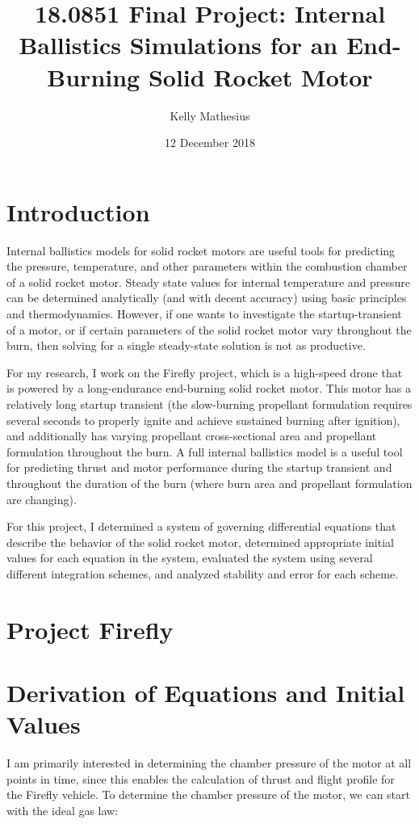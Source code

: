 \documentclass[12pt, letterpaper, twoside]{article}
\title{18.0851 Final Project: Internal Ballistics Simulations for an End-Burning Solid Rocket Motor}
\author{Kelly Mathesius}
\date{12 December 2018}
\begin{document}
 
 \maketitle
 
\section{Introduction}

Internal ballistics models for solid rocket motors are useful tools for predicting the pressure, temperature, and other parameters within the combustion chamber of a solid rocket motor. Steady state values for internal temperature and pressure can be determined analytically (and with decent accuracy) using basic principles and thermodynamics. However, if one wants to investigate the startup-transient of a motor, or if certain parameters of the solid rocket motor vary throughout the burn, then solving for a single steady-state solution is not as productive.

For my research, I work on the Firefly project, which is a high-speed drone that is powered by a long-endurance end-burning solid rocket motor. This motor has a relatively long startup transient (the slow-burning propellant formulation requires several seconds to properly ignite and achieve sustained burning after ignition), and additionally has varying propellant cross-sectional area and propellant formulation throughout the burn. A full internal ballistics model is a useful tool for predicting thrust and motor performance during the startup transient and throughout the duration of the burn (where burn area and propellant formulation are changing). 

For this project, I determined a system of governing differential equations that describe the behavior of the solid rocket motor, determined appropriate initial values for each equation in the system, evaluated the system using several different integration schemes, and analyzed stability and error for each scheme.

\section{Project Firefly}

\section{Derivation of Equations and Initial Values}

I am primarily interested in determining the chamber pressure of the motor at all points in time, since this enables the calculation of thrust and flight profile for the Firefly vehicle. To determine the chamber pressure of the motor, we can start with the ideal gas law:
\end{document}
